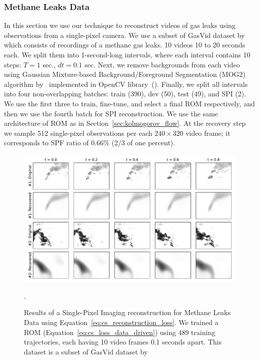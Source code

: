 \subsubsection{Methane Leaks Data}
In this section we use our technique to reconstruct videos of gas leaks using observations from a single-pixel camera. We use a subset of GasVid dataset by~\citep{wang2020machine} which consists of recordings of a methane gas leaks. 10 videos 10 to 20 seconds each. We split them into 1-second-long intervals, where each interval contains 10 steps: $T = 1$ sec., $dt = 0.1$ sec. Next, we remove backgrounds from each video using Gaussian Mixture-based Background/Foreground Segmentation (MOG2) algorithm by~\citep{zivkovic2006efficient,zivkovic2004improved} implemented in OpenCV library~(\citep{opencv_library}). Finally, we split all intervals into four non-overlapping batches: train (390), dev (50), test (49), and SPI (2). We use the first three to train, fine-tune, and select a final ROM respectively, and then we use the fourth batch for SPI reconstruction. We use the same architecture of ROM as in Section~\ref{sec:kolmogorov_flow}. At the recovery step we sample 512 single-pixel observations per each $240 \times 320$ video frame; it corresponds to SPF ratio of $0.66\%$ (2/3 of one percent).

\begin{figure}[t]
	\centering
	\includegraphics[width=\textwidth]{figures/cs_gas_examples.pdf}
	\caption{\label{fig:cs_gas_examples} Results of a Single-Pixel Imaging reconstruction for Methane Leaks Data using Equation~\ref{eq:cs_reconstruction_loss}. We trained a ROM (Equation~\ref{eq:cs_loss_data_driven}) using 489 training trajectories, each having 10 video frames 0.1 seconds apart. This dataset is a subset of GasVid dataset by \citep{wang2020machine}}.
\end{figure}

